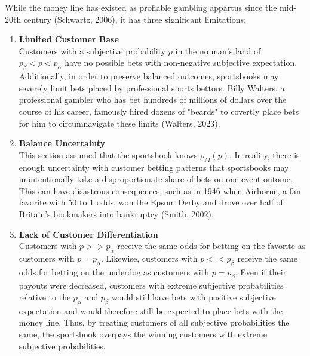 \documentclass[sn-mathphys-num]{sn-jnl}
\theoremstyle{thmstyleone}%
\theoremstyle{thmstyletwo}%
\theoremstyle{thmstylethree}%
\begin{document}
While the money line has existed as profiable gambling appartus since the mid-20th century (Schwartz, 2006), it has three significant limitations:
\vspace{.05in}
\begin {enumerate}
\vspace{.05in}
\item \textbf{Limited Customer Base}
\vspace{.05in}
\\Customers with a subjective probability $p$ in the no man's land of $ p_\beta < p < p_\alpha$ have no possible bets with non-negative subjective expectation. Additionally, in order to preserve balanced outcomes, sportsbooks may severely limit bets placed by professional sports bettors. Billy Walters, a professional gambler who has bet hundreds of millions of dollars over the course of his career, famously hired dozens of "beards" to covertly place bets for him to circumnavigate these limits (Walters, 2023). 

\vspace{.05in}
\item \textbf{Balance Uncertainty}
\vspace{.05in}
\\This section assumed that the sportsbook knows $\rho_M(p)$. In reality, there is enough uncertainty with customer betting patterns that sportsbooks may unintentionally take a disproportionate share of bets on one event outome. This can have disastrous consequences, such as in 1946 when Airborne, a fan favorite with 50 to 1 odds, won the Epsom Derby and drove over half of Britain's bookmakers into bankruptcy (Smith, 2002). 

\vspace{.05in}
\item \textbf{Lack of Customer Differentiation}
\vspace{.05in}
\\Customers with $p >> p_\alpha$ receive the same odds for betting on the favorite as customers with $p = p_\alpha$. Likewise, customers with $p << p_\beta$ receive the same odds for betting on the underdog as customers with $p = p_\beta$. Even if their payouts were decreased, customers with extreme subjective probabilities relative to the $p_\alpha$ and $p_\beta$ would still have bets with positive subjective expectation and would therefore still be expected to place bets with the money line. Thus, by treating customers of all subjective probabilities the same, the sportsbook overpays the winning customers with extreme subjective probabilities.
\end{enumerate}
\end{document}
